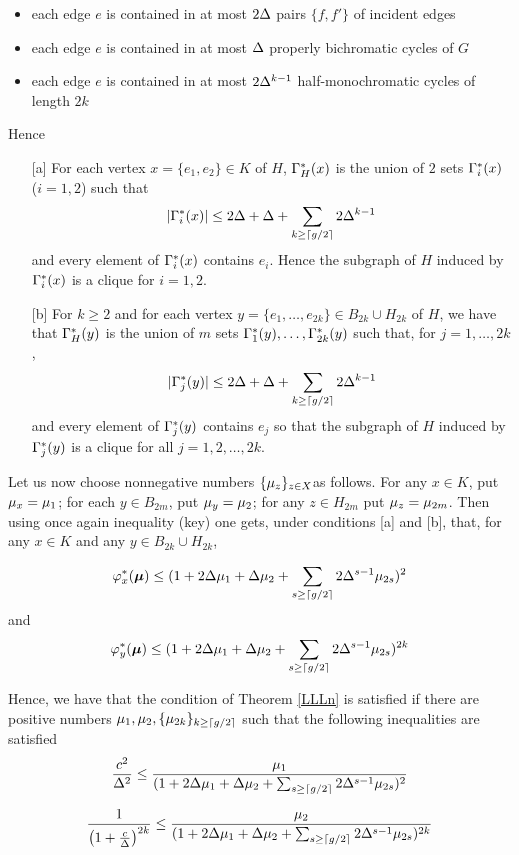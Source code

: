 \documentclass[11pt]{article}
\begin{document}
\begin{itemize}
\item
each edge $e$ is contained in at most $2\Delta$ pairs $\{f,f'\}$ of incident edges
\item
each edge $e$ is contained in at most $\Delta$ properly bichromatic cycles of $G$

\item
each edge $e$ is contained in at most $2\Delta^{k-1}$ half-monochromatic cycles of length $2k$
\end{itemize}
Hence

\begin{itemize}
\item[{[a]}]
For each  vertex $x=\{e_1,e_2\}\in K$ of $H$,
$\Gamma_H^*(x)$ is the union of $2$ sets $\Gamma_i^*(x)$ ($i=1,2$)
such that
$$
|\Gamma_i^*(x)|\le 2{\Delta} +
\Delta + \sum_{k\ge \lceil g/2\rceil }2\Delta^{k-1}
$$
and every element of $\Gamma_i^*(x)$ contains $e_i$.
Hence  the subgraph of $H$  induced by $\Gamma_i^*(x)$ is a clique for $i=1,2$.
\item[{[b]}]
For $k\ge 2$ and for each  vertex $y=\{e_1,\dots,e_{2k}\}\in B_{2k}\cup H_{2k}$ of $H$, we have that
$\Gamma_H^*(y)$ is the union of $m$ sets $\Gamma_1^*(y),\dots,\Gamma_{2k}^*(y)$ such that,
for $j=1,\dots,  2k$,
$$
|\Gamma_j^*(y)|\le 2{\Delta} +
\Delta + \sum_{k\ge \lceil g/2\rceil }2\Delta^{k-1}
$$
and every element of $\Gamma_{j}^*(y)$ contains $e_j$ so that the subgraph of $H$  induced by $\Gamma_j^*(y)$ is a clique
for all $j=1,2,\dots, 2k$.
\end{itemize}
Let us now choose nonnegative  numbers $\{\mu_z\}_{z\in X}$as follows. For any $x\in K$, put $\mu_{x}=\mu_1$; for
each $y\in B_{2m}$, put $\mu_y=\mu_2$;  for any $z\in H_{2m}$ put
$\mu_{z}=\mu_{2m}$. Then using once again inequality \equ(key) one gets, under conditions [a] and [b], that, for any $x\in K$ and any $y\in B_{2k}\cup H_{2k}$,


$$
\varphi^{*}_{x}(\bm \mu)\le(1+ 2\Delta\mu_{1} + \Delta\mu_2+\sum_{s\ge \lceil g/2\rceil }2\Delta^{s-1}\mu_{2s})^{2}
$$
and
$$
\varphi^{*}_{y}(\bm \mu)\le(1+ 2\Delta\mu_{1} + \Delta\mu_2+\sum_{s\ge \lceil g/2\rceil }2\Delta^{s-1}\mu_{2s})^{2k}
$$


Hence, we have that the condition of Theorem \ref{LLLn} is satisfied
if there are positive numbers $\mu_1,\mu_2,\{\mu_{2k}\}_{k\ge  \lceil g/2\rceil}$ such that the following inequalities are satisfied
$$
{c^2\over \Delta^2}\le {\mu_{1}\over (1+ 2\Delta\mu_1 + \Delta\mu_2+ \sum_{s\ge \lceil g/2\rceil}2\Delta^{s-1}\mu_{2s})^2}
$$


$$
{1\over \left(1+{c\over \Delta}\right)^{2k}}\le
{\mu_{2}\over (1+ 2\Delta\mu_1 + \Delta\mu_2+ \sum_{s\ge \lceil g/2\rceil}2\Delta^{s-1}\mu_{2s})^{2k}}
$$
\end{document}
